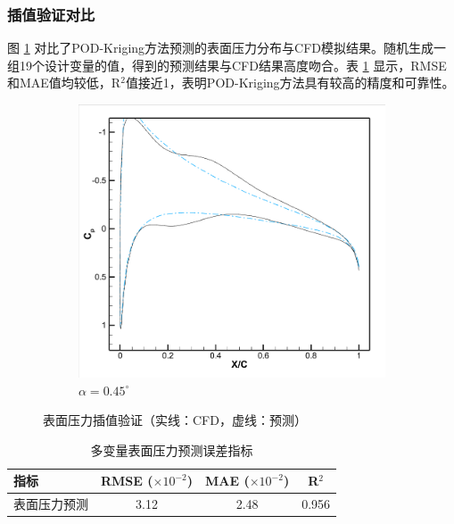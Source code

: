\subsubsection{插值验证对比}

图 \ref{fig:kriging_surface_validation} 对比了POD-Kriging方法预测的表面压力分布与CFD模拟结果。随机生成一组19个设计变量的值，得到的预测结果与CFD结果高度吻合。表 \ref{tab:kriging_surface_error} 显示，RMSE和MAE值均较低，R$^2$值接近1，表明POD-Kriging方法具有较高的精度和可靠性。

\begin{figure}[H]
    \centering
    \begin{subfigure}[b]{0.45\textwidth}
        \includegraphics[width=\textwidth]{image/表面压力对比图/多变量第二组！.png}
        \caption{$\alpha=0.45^\circ$}
    \end{subfigure}
    \caption{\songti 表面压力插值验证（实线：CFD，虚线：预测）}
    \label{fig:kriging_surface_validation}
\end{figure}

\begin{table}[H]
    \centering
    \caption{多变量表面压力预测误差指标}
    \label{tab:kriging_surface_error}
    \begin{tabular}{lccc}
        \toprule
        \textbf{指标} & \textbf{RMSE} ($\times10^{-2}$) & \textbf{MAE} ($\times10^{-2}$) & \textbf{R$^2$} \\
        \midrule
        表面压力预测 & 3.12 & 2.48 & 0.956 \\
        \bottomrule
    \end{tabular}
\end{table}

